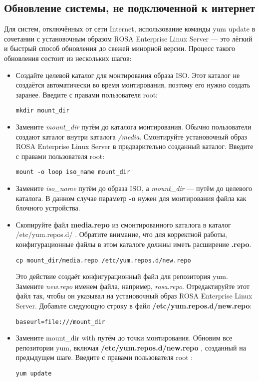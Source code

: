\documentclass[a4paper,10pt,twoside]{article}
\begin{document}
\subsection{Обновление системы, не подключенной к интернет}
Для систем, отключённых от сети Internet, использование команды yum update в сочетании с установочным образом ROSA Enterprise Linux Server — это лёгкий и быстрый способ обновления до свежей минорной версии. Процесс такого обновления состоит из нескольких шагов:

\begin{itemize}
 \item Создайте целевой каталог для монтирования образа ISO. Этот каталог не создаётся автоматически во время монтирования, поэтому его нужно создать заранее. Введите с правами пользователя root:
\begin{verbatim}
mkdir mount_dir\end{verbatim} 
\item Замените \textit{mount\_dir} путём до каталога монтирования. Обычно пользователи создают каталог внутри каталога \textit{/media}. Смонтируйте установочный образ ROSA Enterprise Linux Server в предварительно созданный каталог. Введите с правами пользователя root:
\begin{verbatim}
mount -o loop iso_name mount_dir\end{verbatim} 
\item Замените \textit{iso\_name} путём до образа ISO, а \textit{mount\_dir} — путём до целевого каталога. В данном случае параметр \textbf{-o} нужен для монтирования файла как блочного устройства.
\item Скопируйте файл \textbf{media.repo} из смонтированного каталога в каталог /etc/yum.repos.d/ . Обратите внимание, что для корректной работы, конфигурационные файлы в этом каталоге должны иметь расширение \textbf{.repo}. 
\begin{verbatim}
cp mount_dir/media.repo /etc/yum.repos.d/new.repo\end{verbatim} 

Это действие создаёт конфигурационный файл для репозитория yum. Замените \textit{new.repo} именем файла, например, \textit{rosa.repo}. Отредактируйте этот файл так, чтобы он указывал на установочный образ ROSA Enterprise Linux Server. Добавьте следующую строку в файл \textbf{/etc/yum.repos.d/new.repo}:
\begin{verbatim}
baseurl=file:///mount_dir\end{verbatim} 
\item Замените mount\_dir with путём до точки монтирования. Обновим все репозитории yum, включая \textbf{/etc/yum.repos.d/new.repo} , созданный на предыдущем шаге. Введите с правами пользователя root :
\begin{verbatim}
yum update\end{verbatim} 


\end{itemize}
\end{document}

